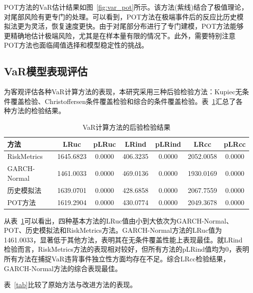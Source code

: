 \documentclass[12pt, a4paper]{article}
\begin{document}
POT方法的VaR估计结果如图~\ref{fig:var_pot}所示。该方法(紫线)结合了极值理论，对尾部风险有更专门的处理。可以看到，POT方法在极端事件后的反应比历史模拟法更为灵活，恢复速度更快。由于对尾部分布进行了专门建模，POT方法能够更精确地估计极端风险，尤其是在样本量有限的情况下。此外，需要特别注意POT方法也面临阈值选择和模型稳定性的挑战。

\subsection{VaR模型表现评估}

为客观评估各种VaR计算方法的表现，本研究采用三种后验检验方法：Kupiec无条件覆盖检验、Christoffersen条件覆盖检验和综合的条件覆盖检验。表~\ref{tab_all}汇总了各种方法的检验结果。

\begin{table}[htbp]
\centering
\caption{VaR计算方法的后验检验结果}
\label{tab_all}
\begin{tabular}{lcccccc}
\toprule
\textbf{方法} & \textbf{LRuc} & \textbf{pLRuc} & \textbf{LRind} & \textbf{pLRind} & \textbf{LRcc} & \textbf{pLRcc} \\
\midrule
RiskMetrics & 1645.6823 & 0.0000 & 406.3235 & 0.0000 & 2052.0058 & 0.0000 \\
GARCH-Normal & 1461.0033 & 0.0000 & 469.0136 & 0.0000 & 1930.0169 & 0.0000 \\
历史模拟法 & 1639.0701 & 0.0000 & 428.6858 & 0.0000 & 2067.7559 & 0.0000 \\
POT方法 & 1619.2904 & 0.0000 & 430.0774 & 0.0000 & 2049.3678 & 0.0000 \\
\bottomrule
\end{tabular}
\end{table}
    
从表~\ref{tab_all}可以看出，四种基本方法的LRuc值由小到大依次为GARCH-Normal、POT、历史模拟法和RiskMetrics方法。GARCH-Normal方法的LRuc值为1461.0033，显著低于其他方法，表明其在无条件覆盖性能上表现最佳。就LRind检验而言，RiskMetrics方法的表现相对较好，但所有方法的pLRind值均为0，表明所有方法在捕捉VaR违背事件独立性方面均存在不足。综合LRcc检验结果，GARCH-Normal方法的综合表现最佳。

表~\ref{tab}比较了原始方法与改进方法的表现。
\end{document}
